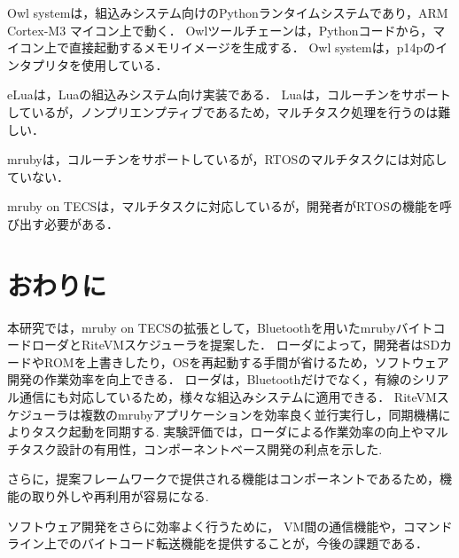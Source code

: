 \documentclass[submit,techrep]{ipsj}
\begin{document}
Owl systemは，組込みシステム向けのPythonランタイムシステムであり，ARM Cortex-M3 マイコン上で動く．
Owlツールチェーンは，Pythonコードから，マイコン上で直接起動するメモリイメージを生成する．
Owl systemは，p14pのインタプリタを使用している．

eLuaは，Luaの組込みシステム向け実装である．
Luaは，コルーチンをサポートしているが，ノンプリエンプティブであるため，マルチタスク処理を行うのは難しい．

mrubyは，コルーチンをサポートしているが，RTOSのマルチタスクには対応していない．

mruby on TECSは，マルチタスクに対応しているが，開発者がRTOSの機能を呼び出す必要がある．


\vspace{-2mm}
\section{おわりに}
\vspace{-2mm}
\label{sec:Conclusion}
本研究では，mruby on TECSの拡張として，Bluetoothを用いたmrubyバイトコードローダとRiteVMスケジューラを提案した．
ローダによって，開発者はSDカードやROMを上書きしたり，OSを再起動する手間が省けるため，ソフトウェア開発の作業効率を向上できる．
ローダは，Bluetoothだけでなく，有線のシリアル通信にも対応しているため，様々な組込みシステムに適用できる．
RiteVMスケジューラは複数のmrubyアプリケーションを効率良く並行実行し，同期機構によりタスク起動を同期する.
実験評価では，ローダによる作業効率の向上やマルチタスク設計の有用性，コンポーネントベース開発の利点を示した.

さらに，提案フレームワークで提供される機能はコンポーネントであるため，機能の取り外しや再利用が容易になる.

ソフトウェア開発をさらに効率よく行うために，%
VM間の通信機能や，コマンドライン上でのバイトコード転送機能を提供することが，今後の課題である．
\end{document}
